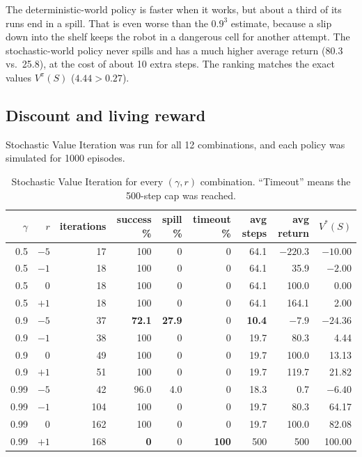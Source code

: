 \documentclass[10.5pt]{article}
\begin{document}
The deterministic-world policy is faster when it works, but about a third of its runs end in a spill. That is even
worse than the $0.9^3$ estimate, because a slip down into the shelf keeps the robot in a dangerous cell for another
attempt. The stochastic-world policy never spills and has a much higher average return (80.3 vs.\ 25.8), at the cost
of about 10 extra steps. The ranking matches the exact values $V^\pi(S)$ ($4.44>0.27$).

\subsection{Discount and living reward}

Stochastic Value Iteration was run for all 12 combinations, and each policy was simulated for 1000 episodes.

\begin{table}[H]\centering\small
\begin{tabular}{rrrrrrrrr}
\toprule
$\gamma$ & $r$ & iterations & success \% & spill \% & timeout \% & avg steps & avg return & $V^*(S)$\\
\midrule
0.5 & $-5$ & 17 & 100 & 0 & 0 & 64.1 & $-220.3$ & $-10.00$\\
0.5 & $-1$ & 18 & 100 & 0 & 0 & 64.1 & 35.9 & $-2.00$\\
0.5 & 0 & 18 & 100 & 0 & 0 & 64.1 & 100.0 & 0.00\\
0.5 & $+1$ & 18 & 100 & 0 & 0 & 64.1 & 164.1 & 2.00\\
\midrule
0.9 & $-5$ & 37 & \textbf{72.1} & \textbf{27.9} & 0 & \textbf{10.4} & $-7.9$ & $-24.36$\\
0.9 & $-1$ & 38 & 100 & 0 & 0 & 19.7 & 80.3 & 4.44\\
0.9 & 0 & 49 & 100 & 0 & 0 & 19.7 & 100.0 & 13.13\\
0.9 & $+1$ & 51 & 100 & 0 & 0 & 19.7 & 119.7 & 21.82\\
\midrule
0.99 & $-5$ & 42 & 96.0 & 4.0 & 0 & 18.3 & 0.7 & $-6.40$\\
0.99 & $-1$ & 104 & 100 & 0 & 0 & 19.7 & 80.3 & 64.17\\
0.99 & 0 & 162 & 100 & 0 & 0 & 19.7 & 100.0 & 82.08\\
0.99 & $+1$ & 168 & \textbf{0} & 0 & \textbf{100} & 500 & 500 & 100.00\\
\bottomrule
\end{tabular}
\caption{Stochastic Value Iteration for every $(\gamma,r)$ combination. ``Timeout'' means the 500-step cap was reached.}
\end{table}
\end{document}
